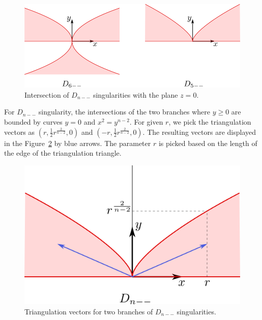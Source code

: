 \begin{figure}
    \centerline{\includegraphics[scale=0.5]{images/img6}}
    \caption[Intersection of $D_{n--}$ singularities with the plane $z=0$]
    {Intersection of $D_{n--}$ singularities with the plane $z=0$.}
    \label{img:6}
\end{figure}

For $D_{n--}$ singularity, the intersections of the two branches where
$y \geq 0$ are bounded by curves $y=0$ and $x^2=y^{n-2}$. For given $r$,
we pick the triangulation vectors as $(r, \frac{1}{2}r^{\frac{2}{n-2}}, 0)$
and $(-r, \frac{1}{2}r^{\frac{2}{n-2}}, 0)$. The resulting vectors are
displayed in the Figure~\ref{img:9} by blue arrows. The parameter $r$ is picked based
on the length of the edge of the triangulation triangle.
\begin{figure}
    \centerline{\includegraphics[scale=0.5]{images/img9}}
    \caption[Triangulation vectors for two branches of $D_{n--}$ singularities]
    {Triangulation vectors for two branches of $D_{n--}$ singularities.}
    \label{img:9}
\end{figure}

